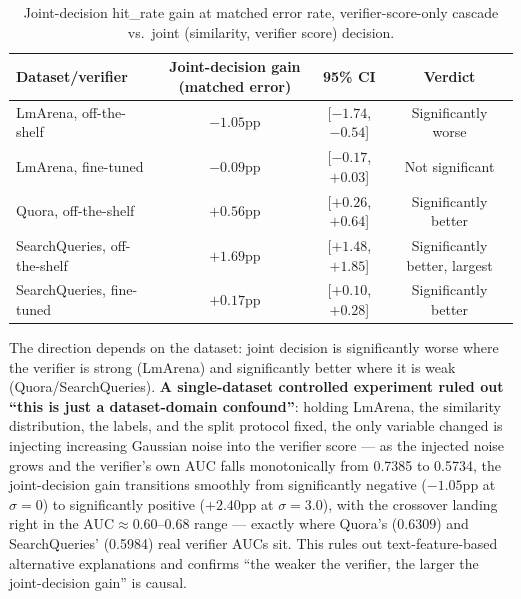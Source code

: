 \documentclass[11pt]{article}
\newenvironment{fittab}{\begin{lrbox}{\fittabbox}}{\end{lrbox}%
  \ifdim\wd\fittabbox>\linewidth\resizebox{\linewidth}{!}{\usebox{\fittabbox}}\else\usebox{\fittabbox}\fi}
\begin{document}
\begin{table}[h]
\centering
\small
\begin{fittab}\begin{tabular}{@{}lccc@{}}
\toprule
\textbf{Dataset/verifier} & \textbf{Joint-decision gain (matched error)} & \textbf{95\% CI} & \textbf{Verdict} \\
\midrule
LmArena, off-the-shelf & $-1.05$pp & [$-1.74$, $-0.54$] & Significantly worse \\
LmArena, fine-tuned & $-0.09$pp & [$-0.17$, $+0.03$] & Not significant \\
Quora, off-the-shelf & $+0.56$pp & [$+0.26$, $+0.64$] & Significantly better \\
SearchQueries, off-the-shelf & $+1.69$pp & [$+1.48$, $+1.85$] & Significantly better, largest \\
SearchQueries, fine-tuned & $+0.17$pp & [$+0.10$, $+0.28$] & Significantly better \\
\bottomrule
\end{tabular}\end{fittab}
\caption{Joint-decision hit\_rate gain at matched error rate, verifier-score-only cascade vs.\ joint (similarity, verifier score) decision.}
\end{table}

The direction depends on the dataset: joint decision is significantly worse where the verifier is strong (LmArena) and significantly better where it is weak (Quora/SearchQueries). \textbf{A single-dataset controlled experiment ruled out ``this is just a dataset-domain confound''}: holding LmArena, the similarity distribution, the labels, and the split protocol fixed, the only variable changed is injecting increasing Gaussian noise into the verifier score --- as the injected noise grows and the verifier's own AUC falls monotonically from 0.7385 to 0.5734, the joint-decision gain transitions smoothly from significantly negative ($-1.05$pp at $\sigma=0$) to significantly positive ($+2.40$pp at $\sigma=3.0$), with the crossover landing right in the AUC$\approx$0.60--0.68 range --- exactly where Quora's (0.6309) and SearchQueries' (0.5984) real verifier AUCs sit. This rules out text-feature-based alternative explanations and confirms ``the weaker the verifier, the larger the joint-decision gain'' is causal.
\end{document}
